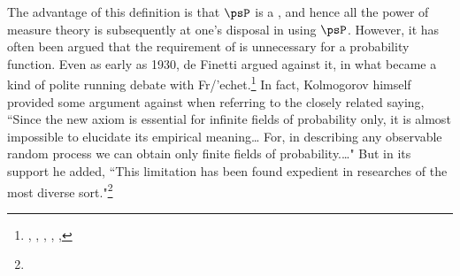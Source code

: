 \begin{remark}
The advantage of this definition is that $\psP$ is a , and hence all the power of measure theory
is subsequently at one's disposal in using $\psP$.
However, it has often been argued that the requirement of  is unnecessary for a probability function.
Even as early as 1930, de Finetti argued against it, in what became a kind of polite running debate with Fr/'echet.\footnote{
  ,
  ,
  ,
  ,
  ,
  }
In fact, Kolmogorov himself provided some argument against  when referring to the closely related
 saying,
``Since the new axiom is essential for infinite fields of probability only,
it is almost impossible to elucidate its empirical meaning\ldots
For, in describing any observable random process we can obtain only finite fields of probability.\ldots"
But in its support he added, ``This limitation has been found expedient in researches of the most diverse sort."\footnote{
  }


\end{remark}

